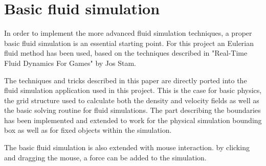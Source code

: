 \chapter{Basic fluid simulation}

In order to implement the more advanced fluid simulation techniques, a proper basic fluid simulation is an essential starting point. For this project an Eulerian fluid method has been used, based on the techniques described in "Real-Time Fluid Dynamics For Games" by Jos Stam. 

The techniques and tricks described in this paper are directly ported into the fluid simulation application used in this project. This is the case for basic physics, the grid structure used to calculate both the density and velocity fields as well as the basic solving routine for fluid simulations. The part describing the boundaries has been implemented and extended to work for the physical simulation bounding box as well as for fixed objects within the simulation. 

The basic fluid simulation is also extended with mouse interaction. by clicking and dragging the mouse, a force can be added to the simulation.  